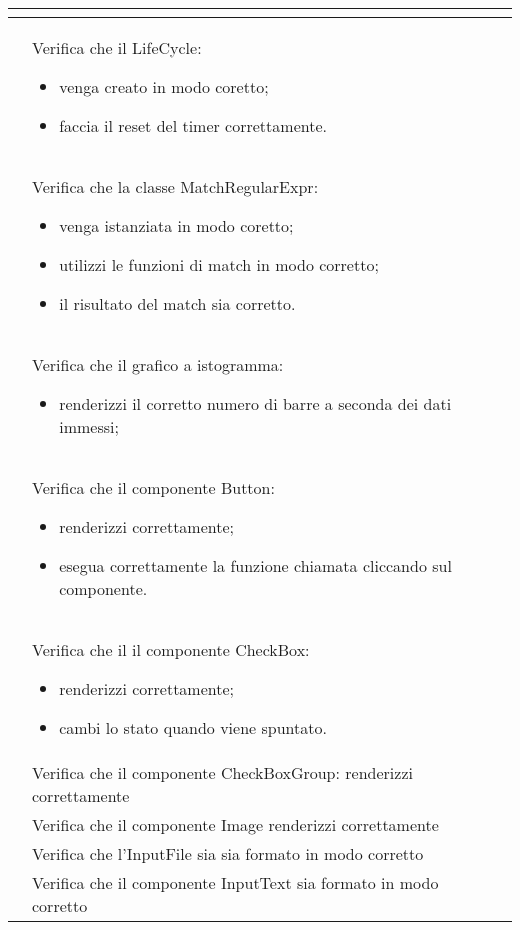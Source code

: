 \begin{longtable}{|c|P{9cm}|c|}
\begin{itemize}
	\end{itemize}
	 \\
	\hline {}\label{tu-lifecycle} & Verifica che il LifeCycle:
	\begin{itemize}
		\item venga creato in modo coretto;
		\item faccia il reset del timer correttamente.
	\end{itemize}
	 \\
	\hline {}\label{tu-regex} & Verifica che la classe MatchRegularExpr:
	\begin{itemize}
		\item venga istanziata in modo coretto;
		\item utilizzi le funzioni di match in modo corretto;
		\item il risultato del match sia corretto.
	\end{itemize}
	 \\
	\hline {}\label{tu-barchart} & Verifica che il grafico a istogramma:
	\begin{itemize}
		\item renderizzi il corretto numero di barre a seconda dei dati immessi;
	\end{itemize}
	 \\
	\hline {}\label{tu-button} & Verifica che il componente Button:
	\begin{itemize}
		\item renderizzi correttamente;
		\item esegua correttamente la funzione chiamata cliccando sul componente.
	\end{itemize}
	 \\
	\hline {}\label{tu-checkbox} & Verifica che il il componente CheckBox:
	\begin{itemize}
		\item renderizzi correttamente;
		\item cambi lo stato quando viene spuntato.
	\end{itemize}
	 \\
	\hline {}\label{tu-checkboxgroup} & Verifica che il componente CheckBoxGroup: renderizzi correttamente  \\
	\hline {}\label{tu-image} & Verifica che il componente Image renderizzi correttamente	 \\
	\hline {}\label{tu-inputfile} & Verifica che l'InputFile sia sia formato in modo corretto  \\
	\hline {} & Verifica che il componente InputText sia formato in modo corretto  \\

\end{longtable}
